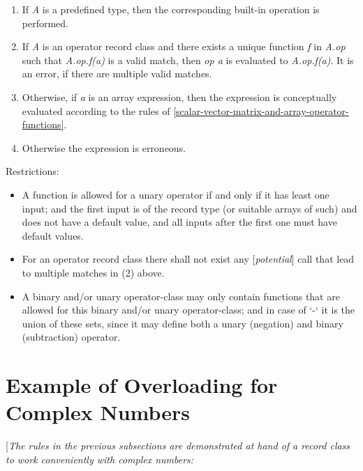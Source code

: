 \documentclass[10pt,a4paper]{report}
\def\doublelabel#1{\label{#1}\hypertarget{#1}{}}
\renewcommand{\labelenumi}{\arabic{enumi}.}
\begin{document}
\begin{enumerate}
\def\labelenumi{\arabic{enumi}.}
\item
  If \emph{A} is a {predefined type}, then the corresponding built-in
  operation is performed.
\item
  If \emph{A} is an {operator record class} and there exists a {unique}
  function \emph{f} in \emph{A.op} such that \emph{A.op.f(a)} is a valid
  match, then \emph{op a} is evaluated to \emph{A.op.f(a)}. It is an
  error, if there are multiple valid matches.
\item
  Otherwise, if \emph{a} is an {array expression}, then the expression
  is conceptually evaluated according to the rules of \ref{scalar-vector-matrix-and-array-operator-functions}.
\item
  Otherwise the expression is erroneous.
\end{enumerate}

Restrictions:

\begin{itemize}
\item
  A function is allowed for a unary operator if and only if it has least
  one input; and the first input is of the record type (or suitable
  arrays of such) and does not have a default value, and all inputs
  after the first one must have default values.
\item
  For an operator record class there shall not exist {any}
  {[}\emph{potential}{]} call that lead to multiple matches in (2)
  above.
\item
  A binary and/or unary operator-class may only contain functions that
  are allowed for this binary and/or unary operator-class; and in case
  of `-` it is the union of these sets, since it may define both a unary
  (negation) and binary (subtraction) operator.
\end{itemize}

\section{Example of Overloading for Complex Numbers}\doublelabel{example-of-overloading-for-complex-numbers}

{[}\emph{The rules in the previous subsections are demonstrated at hand
of a record class to work conveniently with complex numbers:}
\end{document}
